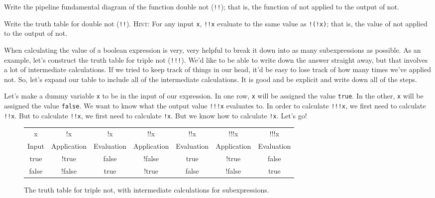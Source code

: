 \begin{question}
  Write the pipeline fundamental diagram of the function double \textsf{not} (\texttt{!!}); that is, the function of \textsf{not} applied to the output of \textsf{not}.
\end{question}

\begin{question}
  Write the truth table for double \textsf{not} (\texttt{!!}). \textsc{Hint:} For any input \texttt{x}, \texttt{!!x} evaluate to the same value as \texttt{!(!x)}; that is, the value of \textsf{not} applied to the output of \textsf{not}.
\end{question}

When calculating the value of a boolean expression is very, very helpful to break it down into as many subexpressions as possible. As an example, let's construct the truth table for triple \textsf{not} (\texttt{!!!}). We'd like to be able to write down the answer straight away, but that involves a lot of intermediate calculations. If we tried to keep track of things in our head, it'd be easy to lose track of how many times we've applied \textsf{not}. So, let's expand our table to include all of the intermediate calculations.  It is good and be explicit and write down all of the steps.

Let's make a dummy variable \texttt{x} to be in the input of our expression. In one row, \texttt{x} will be assigned the value \texttt{true}. In the other, \texttt{x} will be assigned the value \texttt{false}. We want to know what the output value \texttt{!!!x} evaluates to. In order to calculate \texttt{!!!x}, we first need to calculate \texttt{!!x}. But to calculate \texttt{!!x}, we first need to calculate \texttt{!x}. But we know how to calculate \texttt{!x}. Let's go!

\begin{figure*}[h]
  \ttfamily
  \color{cyan}
  \small
  \begin{tabular}{c c c c c c c}
    x & !x & !x & !!x & !!x & !!!x & !!!x \\
    \textsf{Input} & \textsf{Application} & \textsf{Evaluation} & \textsf{Application} & \textsf{Evaluation} & \textsf{Application} & \textsf{Evaluation}\\
    \hline
    true & !true & false & !false & true & !true & false\\
    false & !false & true & !true & false & !false & true
  \end{tabular}
  \caption{\label{fig:conditional-triple-not-table}The truth table for triple \textsf{not}, with intermediate calculations for subexpressions.}
\end{figure*}

